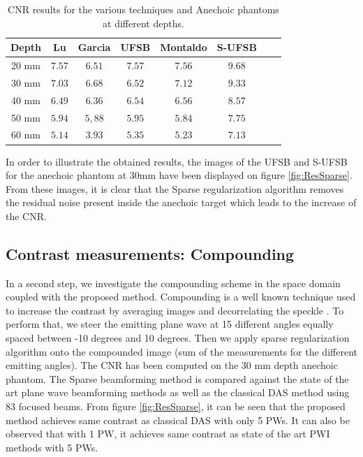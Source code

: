 \documentclass[conference]{IEEEtran}
\begin{document}
\begin{table}[ht]
\caption{CNR results for the various techniques and Anechoic phantoms at different depths.}
\centering
\begin{tabular}{c c c c c c c c} \toprule
Depth & Lu & Garcia & UFSB & Montaldo & S-UFSB\\ \midrule
 20 mm & $7.57$ & $6.51$ & $7.57$ & $7.56$ & $9.68$\\
 30 mm & $7.03$ & $6.68$ & $6.52$ & $7.12$ & $9.33$\\
 40 mm & $6.49$ & $6.36$ & $6.54$ & $6.56$ & $8.57$\\ 
 50 mm & $5.94$ & $5,88$ & $5.95$ & $5.84$ & $7.75$\\ 
 60 mm & $5.14$ & $3.93$ & $5.35$ & $5.23$ & $7.13$\\  
 \bottomrule
\end{tabular}
\label{tab:CNR_depth}
\end{table}

\par In order to illustrate the obtained results, the images of the UFSB and S-UFSB for the anechoic phantom at 30mm have been displayed on figure \ref{fig:ResSparse}. From these images, it is clear that the Sparse regularization algorithm removes the residual noise present inside the anechoic target which leads to the increase of the CNR.  

\subsection{Contrast measurements: Compounding}
\par In a second step, we investigate the compounding scheme in the space domain coupled with the proposed method. Compounding is a well known technique used to increase the contrast by averaging images and decorrelating the speckle \cite{Montaldo_UFFC_2014}. To perform that, we steer the emitting plane wave at 15 different angles equally spaced between -10 degrees and 10 degrees. Then we apply sparse regularization algorithm onto the compounded image (sum of the measurements for the different emitting angles). 
The CNR has been computed on the 30 mm depth anechoic phantom. The Sparse beamforming method is compared against the state of the art plane wave beamforming methods as well as the classical DAS method using 83 focused beams.
From figure \ref{fig:ResSparse}, it can be seen that the proposed method achieves same contrast as classical DAS with only 5 PWs. It can also be observed that with 1 PW, it achieves same contrast as state of the art PWI methods with 5 PWs.
\end{document}
